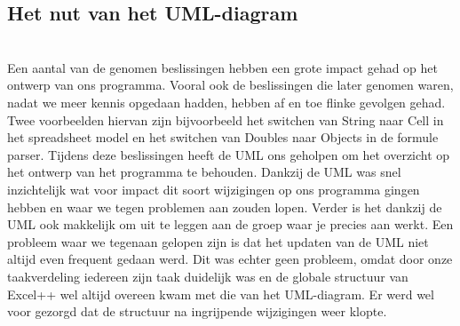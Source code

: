 \documentclass[a4paper,11pt]{article}
\begin{document}
\subsection{Het nut van het UML-diagram}\mbox{}\\
Een aantal van de genomen beslissingen hebben een grote impact gehad op het ontwerp van ons programma. Vooral ook de beslissingen die later genomen waren, nadat we meer kennis opgedaan hadden, hebben af en toe flinke gevolgen gehad. Twee voorbeelden hiervan zijn bijvoorbeeld het switchen van String naar Cell in het spreadsheet model en het switchen van Doubles naar Objects in de formule parser. Tijdens deze beslissingen heeft de UML ons geholpen om het overzicht op het ontwerp van het programma te behouden. Dankzij de UML was snel inzichtelijk wat voor impact dit soort wijzigingen op ons programma gingen hebben en waar we tegen problemen aan zouden lopen. Verder is het dankzij de UML ook makkelijk om uit te leggen aan de groep waar je precies aan werkt.
Een probleem waar we tegenaan gelopen zijn is dat het updaten van de UML niet altijd even frequent gedaan werd. Dit was echter geen probleem, omdat door onze taakverdeling iedereen zijn taak duidelijk was en de globale structuur van Excel++ wel altijd overeen kwam met die van het UML-diagram. Er werd wel voor gezorgd dat de structuur na ingrijpende wijzigingen weer klopte.
\end{document}
